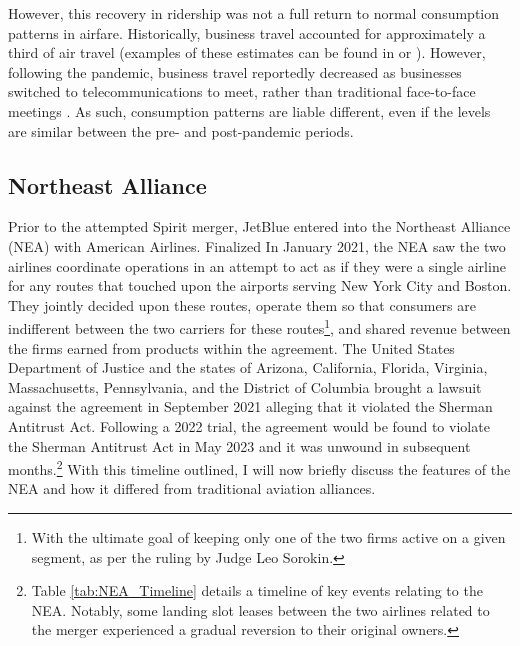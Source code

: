\documentclass{article}
\begin{document}
	However, this recovery in ridership was not a full return to normal consumption patterns in airfare. Historically, business travel accounted for approximately a third of air travel (examples of these estimates can be found in \citet{berry_tracing_2010} or \citet{bet_market_2021}). However, following the pandemic, business travel reportedly decreased as businesses switched to telecommunications to meet, rather than traditional face-to-face meetings \citep{semuels_business_2021}. As such, consumption patterns are liable different, even if the levels are similar between the pre- and post-pandemic periods. 
	
	\subsection{Northeast Alliance}
	\label{sec:Setting_NEA}
	
	Prior to the attempted Spirit merger, JetBlue entered into the Northeast Alliance (NEA) with American Airlines. Finalized In January 2021, the NEA saw the two airlines coordinate operations in an attempt to act as if they were a single airline for any routes that touched upon the airports serving New York City and Boston. They jointly decided upon these routes, operate them so that consumers are indifferent between the two carriers for these routes\footnote{With the ultimate goal of keeping only one of the two firms active on a given segment, as per the ruling by Judge Leo Sorokin.}, and shared revenue between the firms earned from products within the agreement. The United States Department of Justice and the states of Arizona, California, Florida, Virginia, Massachusetts, Pennsylvania, and the District of Columbia brought a lawsuit against the agreement in September 2021 alleging that it violated the Sherman Antitrust Act.  Following a 2022 trial, the agreement would be found to violate the Sherman Antitrust Act in May 2023 and it was unwound in subsequent months\citep{rennison_jetblue-american_2023, rains_what_2023}.\footnote{Table \ref{tab:NEA_Timeline} details a timeline of key events relating to the NEA. Notably, some landing slot leases between the two airlines related to the merger experienced a gradual reversion to their original owners.} With this timeline outlined, I will now briefly discuss the features of the NEA and how it differed from traditional aviation alliances. 
	
\end{document}
